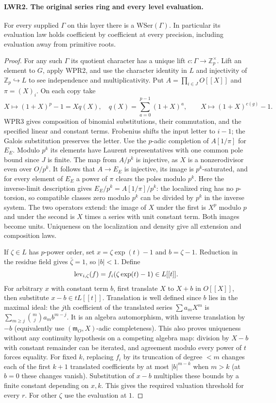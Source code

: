 \paragraph{LWR2. The original series ring and every level evaluation.}
\label{claim:LWR2}
For every supplied $\Gamma$ on this layer there is a $\mathrm{WSer}(\Gamma)$.
In particular its evaluation law holds coefficient by coefficient at
every precision, including evaluation away from primitive roots.

\begin{proof}
For any such $\Gamma$ its quotient character has a unique lift
$c:\Gamma\to\mathbb Z_p^\times$. Lift an element to $G$, apply WPR2,
and use the character identity in $L$ and injectivity of
$\mathbb Z_p\hookrightarrow L$ to see independence and multiplicativity.
Put $A=\prod_{i\in J}O[[X]]$ and $\pi=(X)_i$. On each copy take
\[
 X\longmapsto(1+X)^p-1=Xq(X),\quad q(X)=\sum_{a=0}^{p-1}(1+X)^a,
 \qquad X\longmapsto (1+X)^{c(g)}-1.
\]
WPR3 gives composition of binomial substitutions, their commutation,
and the specified linear and constant terms. Frobenius shifts the
input letter to $i-1$; the Galois substitution preserves the letter.
Use the $p$-adic completion of $A[1/\pi]$ for $E_E$. Modulo $p^k$
its elements have Laurent representatives with one common pole bound
since $J$ is finite. The map from $A/p^k$ is injective, as $X$ is a
nonzerodivisor even over $O/p^k$. It follows that $A\to E_E$ is
injective, its image is $p^k$-saturated, and for every element of
$E_E$ a power of $\pi$ clears the poles modulo $p^k$. Here the
inverse-limit description gives $E_E/p^k=A[1/\pi]/p^k$: the
localized ring has no $p$-torsion, so compatible classes zero modulo
$p^k$ can be divided by $p^k$ in the inverse system. The two operators
extend: the image of $X$ under the first is $X^p$ modulo $p$ and
under the second is $X$ times a series with unit constant term.
Both images become units. Uniqueness on the localization and density
give all extension and composition laws.

If $\zeta\in L$ has $p$-power order, set
$x=\zeta\exp(t)-1$ and $b=\zeta-1$. Reduction in the residue field
gives $\bar\zeta=1$, so $|b|<1$. Define
\[
    {\rm lev}_{i,\zeta}(f)=f_i(\zeta\exp(t)-1)\in L[[t]].
\]
For arbitrary $x$ with constant term $b$, first translate $X$ to
$X+b$ in $O[[X]]$, then substitute $x-b\in tL[[t]]$. Translation
is well defined since $b$ lies in the maximal ideal:
the $j$th coefficient of the translated series
$\sum a_m X^m$ is $\sum_{m\ge j}\binom mj a_m b^{m-j}$.
It is an algebra automorphism, with inverse translation by $-b$
(equivalently use $(\mathfrak m_O,X)$-adic completeness). This also
proves uniqueness without any continuity hypothesis on a competing
algebra map: division by $X-b$ with constant remainder can be
iterated, and agreement modulo every power of $t$ forces equality.
For fixed $k$, replacing $f_i$ by its truncation of degree $<m$
changes each of the first $k+1$ translated coefficients by at most
$|b|^{m-k}$ when $m>k$ (at $b=0$ these changes vanish).
Substitution of $x-b$ multiplies these bounds by a finite constant
depending on $x,k$. This gives the required valuation threshold for
every $r$. For other $\zeta$ use the evaluation at $1$.


\end{proof}
